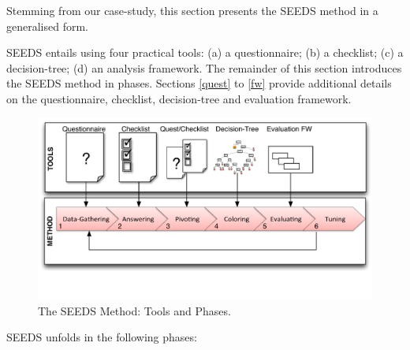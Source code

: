 
Stemming from our case-study, this section presents the SEEDS method in a generalised form. 

SEEDS entails using four practical tools: (a) a questionnaire; (b) a checklist; (c) a decision-tree; (d) an analysis framework. The remainder of this section introduces the SEEDS method in phases. Sections \ref{quest} to \ref{fw} provide additional details on the questionnaire, checklist, decision-tree and evaluation framework.
%

 \begin{figure}[h!]
\includegraphics[width=5.3in]{odessamethod}%
\caption{The SEEDS Method: Tools and Phases.}\label{SEEDS}
\end{figure}
SEEDS unfolds in the following phases:

